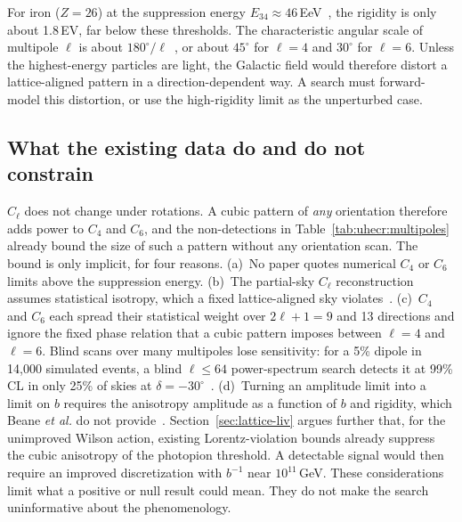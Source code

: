 For iron ($Z=26$) at the suppression energy
$E_{34}\approx46$\,EeV~\cite{PierreAuger2020features}, the rigidity is only
about 1.8\,EV, far below these thresholds. The characteristic angular scale of
multipole $\ell$ is about $180^\circ/\ell$~\cite{PierreAuger2024large}, or about
$45^\circ$ for $\ell=4$ and $30^\circ$ for $\ell=6$. Unless the highest-energy
particles are light, the Galactic field would therefore distort a
lattice-aligned pattern in a direction-dependent way. A search must
forward-model this distortion, or use the high-rigidity limit as the
unperturbed case.

\subsection{What the existing data do and do not constrain}
\label{sec:uhecr:status}

$C_\ell$ does not change under rotations. A cubic pattern of \emph{any}
orientation therefore adds power to $C_4$ and $C_6$, and the non-detections in
Table~\ref{tab:uhecr:multipoles} already bound the size of such a pattern
without any orientation scan. The bound is only implicit, for four reasons.
(a)~No paper quotes numerical $C_4$ or $C_6$ limits above the suppression
energy.
(b)~The partial-sky $C_\ell$ reconstruction assumes statistical isotropy, which
a fixed lattice-aligned sky violates~\cite{PierreAuger2017multiresolution}.
(c)~$C_4$ and $C_6$ each spread their statistical weight over $2\ell+1=9$ and
13 directions and ignore the fixed phase relation that a cubic pattern imposes
between $\ell=4$ and $\ell=6$. Blind scans over many multipoles lose
sensitivity: for a 5\% dipole in 14{,}000 simulated events, a blind
$\ell\le64$ power-spectrum search detects it at 99\% CL in only 25\% of skies
at $\delta=-30^\circ$~\cite{PierreAuger2017multiresolution}.
(d)~Turning an amplitude limit into a limit on $b$ requires the anisotropy
amplitude as a function of $b$ and rigidity, which Beane \emph{et al.} do not
provide~\cite{Beane2014constraints}. Section~\ref{sec:lattice-liv} argues
further that, for the unimproved Wilson action, existing Lorentz-violation
bounds already suppress the cubic anisotropy of the photopion threshold. A
detectable signal would then require an improved discretization with $b^{-1}$
near $10^{11}$\,GeV. These considerations limit what a positive or null result
could mean. They do not make the search uninformative about the phenomenology.

